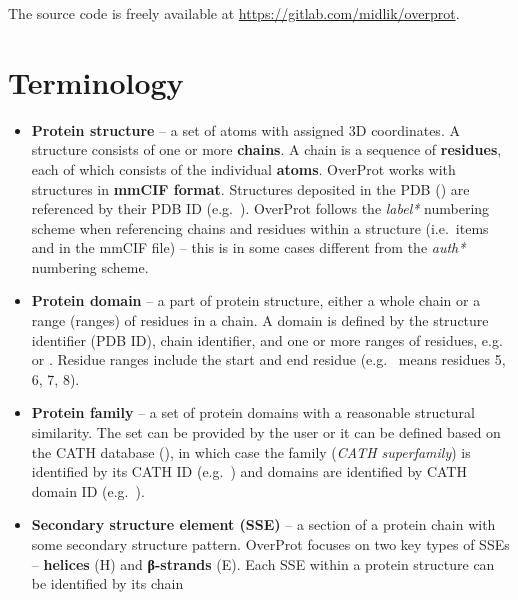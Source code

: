 \documentclass{article}
\begin{document}
The source code is freely available at \url{https://gitlab.com/midlik/overprot}.



\section{Terminology}

\begin{itemize}
  \item
    \textbf{Protein structure} -- a set of atoms with assigned 3D
    coordinates. A structure consists of one or more \textbf{chains}. A
    chain is a sequence of \textbf{residues}, each of which consists of the
    individual \textbf{atoms}. OverProt works with structures in
    \textbf{mmCIF format}. Structures deposited in the PDB 
    ()
    are referenced by their PDB ID (e.g.~). OverProt follows the
    \emph{label*} numbering scheme when referencing chains and residues
    within a structure (i.e.~items  and
     in the mmCIF file) -- this is in some cases
    different from the \emph{auth*} numbering scheme.
  \item
    \textbf{Protein domain} -- a part of protein structure, either a
    whole chain or a range (ranges) of residues in a chain. A domain is
    defined by the structure identifier (PDB ID), chain identifier, and one or more
    ranges of residues, e.g.~ or
    . Residue ranges include the start and end
    residue (e.g.~ means residues 5, 6, 7, 8).
  \item
    \textbf{Protein family} -- a set of protein domains with a reasonable
    structural similarity. The set can be provided by the user or it can
    be defined based on the CATH database (), 
    in which case the family (\emph{CATH superfamily}) is identified by its CATH ID
    (e.g.~) and domains are identified by CATH domain
    ID (e.g.~).
  \item
    \textbf{Secondary structure element (SSE)} -- a section of a protein
    chain with some secondary structure pattern. OverProt focuses on two
    key types of SSEs -- \textbf{helices} (H) and \textbf{β-strands} (E). Each
    SSE within a protein structure can be identified by its chain

\end{itemize}
\end{document}
